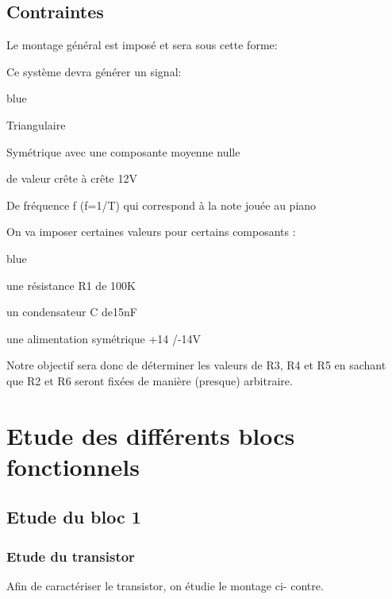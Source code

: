 \section{Contraintes}

Le montage général est imposé et sera sous cette forme:


Ce système devra générer un signal:

\begin{items}{blue}{\Bullet}
    \item Triangulaire
    \item Symétrique avec une composante moyenne nulle
    \item de valeur crête à crête 12V
    \item De fréquence f (f=1/T) qui correspond à la note jouée au piano
\end{items}

On va imposer certaines valeurs pour certains composants : 

\begin{items}{blue}{\Bullet}
\item une résistance R1 de 100K
\item un condensateur C de15nF
\item une alimentation symétrique +14 /-14V
\end{items}

Notre objectif sera donc de déterminer les valeurs de R3, R4 et R5 en sachant que R2 et R6 seront fixées de manière (presque) arbitraire.

\chapter{Etude des différents blocs fonctionnels}
\section{Etude du bloc 1}



\subsection{Etude du transistor}


Afin de caractériser le transistor, on étudie le montage ci- contre.


